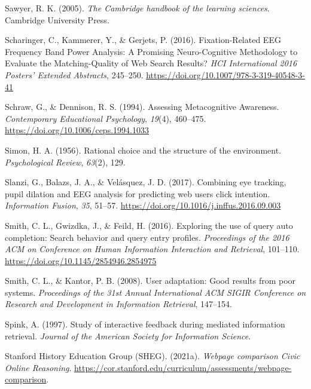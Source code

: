 \documentclass[letterpaper, nobind]{templates/ociamthesis}
\newlength{\cslhangindent}
\newenvironment{CSLReferences}[2] %
 {%
  \setlength{\parindent}{0pt}
  \ifodd #1
  \let\oldpar\par
  \def\par{\hangindent=\cslhangindent\oldpar}
  \fi
  \setlength{\parskip}{1mm}
  \setlength{\baselineskip}{6mm}
 }%
 {}
\begin{document}
\begin{CSLReferences}{1}{0}
\leavevmode{}%
Sawyer, R. K. (2005). \emph{The {Cambridge} handbook of the learning sciences}. {Cambridge University Press}.

\leavevmode{}%
Scharinger, C., Kammerer, Y., \& Gerjets, P. (2016). Fixation-{Related EEG Frequency Band Power Analysis}: {A Promising Neuro}-{Cognitive Methodology} to {Evaluate} the {Matching}-{Quality} of {Web Search Results}? \emph{{HCI International} 2016 \textendash{} {Posters}' {Extended Abstracts}}, 245--250. \url{https://doi.org/10.1007/978-3-319-40548-3-41}

\leavevmode{}%
Schraw, G., \& Dennison, R. S. (1994). Assessing {Metacognitive Awareness}. \emph{Contemporary Educational Psychology}, \emph{19}(4), 460--475. \url{https://doi.org/10.1006/ceps.1994.1033}

\leavevmode{}%
Simon, H. A. (1956). Rational choice and the structure of the environment. \emph{Psychological Review}, \emph{63}(2), 129.

\leavevmode{}%
Slanzi, G., Balazs, J. A., \& Velásquez, J. D. (2017). Combining eye tracking, pupil dilation and {EEG} analysis for predicting web users click intention. \emph{Information Fusion}, \emph{35}, 51--57. \url{https://doi.org/10.1016/j.inffus.2016.09.003}

\leavevmode{}%
Smith, C. L., Gwizdka, J., \& Feild, H. (2016). Exploring the use of query auto completion: {Search} behavior and query entry profiles. \emph{Proceedings of the 2016 {ACM} on Conference on Human Information Interaction and Retrieval}, 101--110. \url{https://doi.org/10.1145/2854946.2854975}

\leavevmode{}%
Smith, C. L., \& Kantor, P. B. (2008). User adaptation: Good results from poor systems. \emph{Proceedings of the 31st Annual International ACM SIGIR Conference on Research and Development in Information Retrieval}, 147--154.

\leavevmode{}%
Spink, A. (1997). Study of interactive feedback during mediated information retrieval. \emph{Journal of the American Society for Information Science}.

\leavevmode{}%
Stanford History Education Group (SHEG). (2021a). \emph{Webpage comparison \textbar{} {Civic Online Reasoning}}. \url{https://cor.stanford.edu/curriculum/assessments/webpage-comparison}.


\end{CSLReferences}
\end{document}
